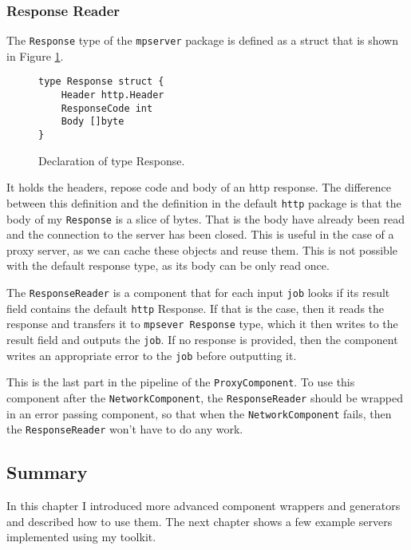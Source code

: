 \newpage
\subsubsection{Response Reader}
The \texttt{Response} type of the \texttt{mpserver} package is defined as
a struct that is shown in Figure \ref{fig:Response}.
\begin{figure}[h]
\centering
\begin{lstlisting}
type Response struct {
    Header http.Header
    ResponseCode int
    Body []byte
}
\end{lstlisting}
\caption[scale=1.0]{Declaration of type Response.}
\label{fig:Response}
\end{figure}

It holds the headers, repose code and body of an http response. 
The difference between
this definition and the definition in the default \texttt{http} package is that
the body of my \texttt{Response} is a slice of bytes. 
That is the body have already been
read and the connection to the server has been closed. This is useful
in the case of a proxy server, as we can cache these objects and reuse
them. This is not possible with the default response type,
as its body can be only read once.

The \texttt{ResponseReader} is a component that for each input \texttt{job}
looks if its result field contains the default \texttt{http} Response. 
If that is the case,
then it reads the response and transfers it to \texttt{mpsever Response} 
type, which it
then writes to the result field and outputs the \texttt{job}. If no response
is provided, then the component writes an appropriate error to the
\texttt{job} before outputting it.

This is the last part in the pipeline of the \texttt{ProxyComponent}.
To use this component after the \texttt{NetworkComponent}, 
the \texttt{ResponseReader} should be wrapped in an error passing 
component, so that when the \texttt{Network\-Component} fails, then 
the \texttt{ResponseReader} won't have to do any work.


\subsection{Summary}
In this chapter I introduced more advanced component wrappers and generators
and described how to use them. The next chapter shows a few example
servers implemented using my toolkit.

